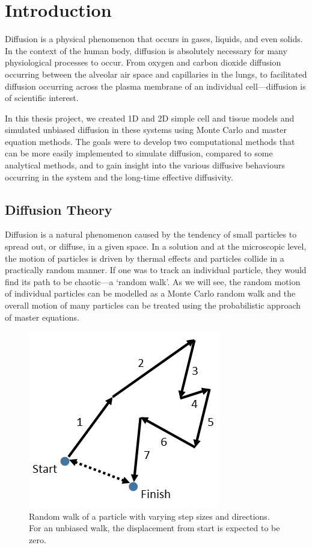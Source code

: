 \chapter{Introduction}
\label{chapter:introduction}

	Diffusion is a physical phenomenon that occurs in gases, liquids, and even solids. In the context of the human body, diffusion is absolutely necessary for many physiological processes to occur. From oxygen and carbon dioxide diffusion occurring between the alveolar air space and capillaries in the lungs, to facilitated diffusion occurring across the plasma membrane of an individual cell---diffusion is of scientific interest.
	
	In this thesis project, we created 1D and 2D simple cell and tissue models and simulated unbiased diffusion in these systems using Monte Carlo and master equation methods. The goals were to develop two computational methods that can be more easily implemented to simulate diffusion, compared to some analytical methods, and to gain insight into the various diffusive behaviours occurring in the system and the long-time effective diffusivity.
	
\section{Diffusion Theory}
\label{sec:intro-diffusion}
	Diffusion is a natural phenomenon caused by the tendency of small particles to spread out, or diffuse, in a given space. In a solution and at the microscopic level, the motion of particles is driven by thermal effects and particles collide in a practically random manner. If one was to track an individual particle, they would find its path to be chaotic---a `random walk'. As we will see, the random motion of individual particles can be modelled as a Monte Carlo random walk and the overall motion of many particles can be treated using the probabilistic approach of master equations.
	
	\begin{figure}[h]
		\centering
		\includegraphics[width=0.5\linewidth]{../images/random-walk}
		\caption{Random walk of a particle with varying step sizes and directions. For an unbiased walk, the displacement from start is expected to be zero.}
		\label{fig:random-walk}
	\end{figure}
	
